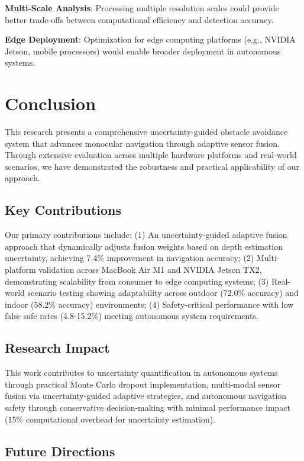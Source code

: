 \documentclass[10pt]{article}
\begin{document}
\textbf{Multi-Scale Analysis}: Processing multiple resolution scales could provide better trade-offs between computational efficiency and detection accuracy.

\textbf{Edge Deployment}: Optimization for edge computing platforms (e.g., NVIDIA Jetson, mobile processors) would enable broader deployment in autonomous systems.

\section{Conclusion}

This research presents a comprehensive uncertainty-guided obstacle avoidance system that advances monocular navigation through adaptive sensor fusion. Through extensive evaluation across multiple hardware platforms and real-world scenarios, we have demonstrated the robustness and practical applicability of our approach.

\subsection{Key Contributions}

Our primary contributions include: (1) An uncertainty-guided adaptive fusion approach that dynamically adjusts fusion weights based on depth estimation uncertainty, achieving 7.4\% improvement in navigation accuracy; (2) Multi-platform validation across MacBook Air M1 and NVIDIA Jetson TX2, demonstrating scalability from consumer to edge computing systems; (3) Real-world scenario testing showing adaptability across outdoor (72.0\% accuracy) and indoor (58.2\% accuracy) environments; (4) Safety-critical performance with low false safe rates (4.8-15.2\%) meeting autonomous system requirements.

\subsection{Research Impact}

This work contributes to uncertainty quantification in autonomous systems through practical Monte Carlo dropout implementation, multi-modal sensor fusion via uncertainty-guided adaptive strategies, and autonomous navigation safety through conservative decision-making with minimal performance impact (15\% computational overhead for uncertainty estimation).

\subsection{Future Directions}
\end{document}
